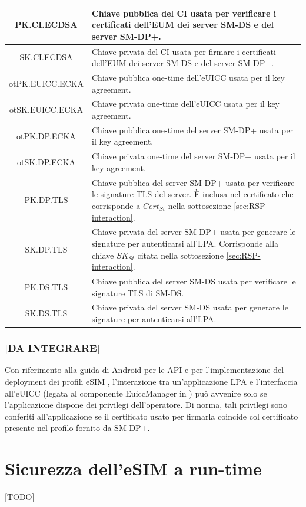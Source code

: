 \documentclass[10pt, twoside, openany]{book}
\begin{document}
\begin{table}[h!]
\begin{center}
\begin{tabularx}{\textwidth}{|c|X|}
\hline
PK.CI.ECDSA &  Chiave pubblica del CI usata per verificare i certificati dell'EUM dei server SM-DS e del server SM-DP+.\\
\hline
SK.CI.ECDSA & Chiave privata del CI usata per firmare i certificati dell'EUM dei server SM-DS e del server SM-DP+.\\
\hline
otPK.EUICC.ECKA & Chiave pubblica one-time dell'eUICC usata per il key agreement.\\
\hline
otSK.EUICC.ECKA & Chiave privata one-time dell'eUICC usata per il key agreement.\\
\hline
otPK.DP.ECKA & Chiave pubblica one-time del server SM-DP+ usata per il key agreement.\\
\hline
otSK.DP.ECKA & Chiave privata one-time del server SM-DP+ usata per il key agreement.\\
\hline
PK.DP.TLS & Chiave pubblica del server SM-DP+ usata per verificare le signature TLS del server. È inclusa nel certificato che corrisponde a $Cert_{St}$ nella sottosezione \ref{sec:RSP-interaction}.\\
\hline
SK.DP.TLS & Chiave privata del server SM-DP+ usata per generare le signature per autenticarsi all'LPA. Corrisponde alla chiave $SK_{St}$ citata nella sottosezione \ref{sec:RSP-interaction}.\\
\hline
PK.DS.TLS & Chiave pubblica del server SM-DS usata per verificare le signature TLS di SM-DS.\\
\hline
SK.DS.TLS & Chiave privata del server SM-DS usata per generare le signature per autenticarsi all'LPA.\\
\hline
\end{tabularx}
\end{center}
\end{table}

\subsection{[DA INTEGRARE]}
Con riferimento alla guida di Android per le API e per l'implementazione del deployment dei profili eSIM \cite{Android-docs}, l'interazione tra un'applicazione LPA e l'interfaccia all'eUICC (legata al componente EuiccManager in \cite{Android-docs}) può avvenire solo se l'applicazione dispone dei privilegi dell'operatore. Di norma, tali privilegi sono conferiti all'applicazione se il certificato usato per firmarla coincide col certificato presente nel profilo fornito da SM-DP+.

\chapter{Sicurezza dell'eSIM a run-time}
[TODO]
\end{document}
